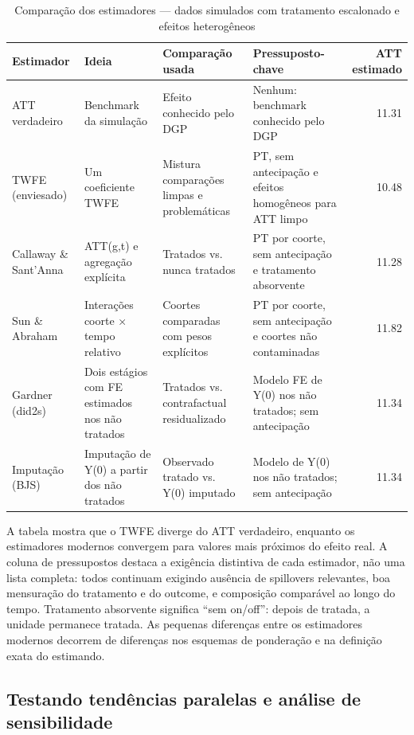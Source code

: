 \documentclass[
]{article}
\begin{document}
\begin{table}

\caption{\label{tab:tabela-comparativa}Comparação dos estimadores — dados simulados com tratamento escalonado e efeitos heterogêneos}
\centering
\begin{tabular}[t]{l|l|l|l|r}
\hline
Estimador & Ideia & Comparação usada & Pressuposto-chave & ATT estimado\\
\hline
ATT verdadeiro & Benchmark da simulação & Efeito conhecido pelo DGP & Nenhum: benchmark conhecido pelo DGP & 11.31\\
\hline
TWFE (enviesado) & Um coeficiente TWFE & Mistura comparações limpas e problemáticas & PT, sem antecipação e efeitos homogêneos para ATT limpo & 10.48\\
\hline
Callaway \& Sant'Anna & ATT(g,t) e agregação explícita & Tratados vs. nunca tratados & PT por coorte, sem antecipação e tratamento absorvente & 11.28\\
\hline
Sun \& Abraham & Interações coorte × tempo relativo & Coortes comparadas com pesos explícitos & PT por coorte, sem antecipação e coortes não contaminadas & 11.82\\
\hline
Gardner (did2s) & Dois estágios com FE estimados nos não tratados & Tratados vs. contrafactual residualizado & Modelo FE de Y(0) nos não tratados; sem antecipação & 11.34\\
\hline
Imputação (BJS) & Imputação de Y(0) a partir dos não tratados & Observado tratado vs. Y(0) imputado & Modelo de Y(0) nos não tratados; sem antecipação & 11.34\\
\hline
\end{tabular}
\end{table}

A tabela mostra que o TWFE diverge do ATT verdadeiro, enquanto os estimadores modernos convergem para valores mais próximos do efeito real. A coluna de pressupostos destaca a exigência distintiva de cada estimador, não uma lista completa: todos continuam exigindo ausência de spillovers relevantes, boa mensuração do tratamento e do outcome, e composição comparável ao longo do tempo. Tratamento absorvente significa ``sem on/off'': depois de tratada, a unidade permanece tratada. As pequenas diferenças entre os estimadores modernos decorrem de diferenças nos esquemas de ponderação e na definição exata do estimando.

\subsection{Testando tendências paralelas e análise de sensibilidade}\label{testando-tenduxeancias-paralelas-e-anuxe1lise-de-sensibilidade}
\end{document}
